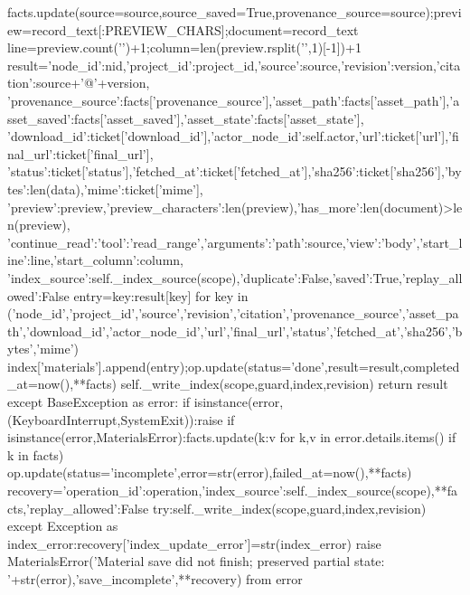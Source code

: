                     facts.update(source=source,source_saved=True,provenance_source=source);preview=record_text[:PREVIEW_CHARS];document=record_text
                line=preview.count('\n')+1;column=len(preview.rsplit('\n',1)[-1])+1
                result={'node_id':nid,'project_id':project_id,'source':source,'revision':version,'citation':source+'@'+version,
                    'provenance_source':facts['provenance_source'],'asset_path':facts['asset_path'],'asset_saved':facts['asset_saved'],'asset_state':facts['asset_state'],
                    'download_id':ticket['download_id'],'actor_node_id':self.actor,'url':ticket['url'],'final_url':ticket['final_url'],
                    'status':ticket['status'],'fetched_at':ticket['fetched_at'],'sha256':ticket['sha256'],'bytes':len(data),'mime':ticket['mime'],
                    'preview':preview,'preview_characters':len(preview),'has_more':len(document)>len(preview),
                    'continue_read':{'tool':'read_range','arguments':{'path':source,'view':'body','start_line':line,'start_column':column}},
                    'index_source':self._index_source(scope),'duplicate':False,'saved':True,'replay_allowed':False}
                entry={key:result[key] for key in ('node_id','project_id','source','revision','citation','provenance_source','asset_path','download_id','actor_node_id','url','final_url','status','fetched_at','sha256','bytes','mime')}
                index['materials'].append(entry);op.update(status='done',result=result,completed_at=now(),**facts)
                self._write_index(scope,guard,index,revision)
                return result
            except BaseException as error:
                if isinstance(error,(KeyboardInterrupt,SystemExit)):raise
                if isinstance(error,MaterialsError):facts.update({k:v for k,v in error.details.items() if k in facts})
                op.update(status='incomplete',error=str(error),failed_at=now(),**facts)
                recovery={'operation_id':operation,'index_source':self._index_source(scope),**facts,'replay_allowed':False}
                try:self._write_index(scope,guard,index,revision)
                except Exception as index_error:recovery['index_update_error']=str(index_error)
                raise MaterialsError('Material save did not finish; preserved partial state: '+str(error),'save_incomplete',**recovery) from error

